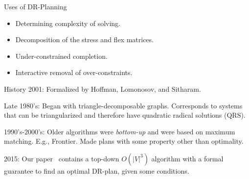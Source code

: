 \documentclass{mySlides}
\newcommand{\n}{\vspace{1em}}
\begin{document}
\begin{frame}{Uses of DR-Planning}
    \begin{itemize}
    \setlength\itemsep{1em}
        \item Determining complexity of solving.
        \item Decomposition of the stress and flex matrices.
        \item Under-constrained completion.
        \item Interactive removal of over-constraints.
    \end{itemize}









\end{frame}

\begin{frame}{History}
    2001: Formalized by Hoffman, Lomonosov, and Sitharam.~\cite{hoffman2001decompositionI}

    \n

    Late 1980's: Began with triangle-decomposable graphs. Corresponds to systems that can be triangularized and therefore have quadratic radical solutions (QRS).

    \n

    1990's-2000's: Older algorithms were \emph{bottom-up} and were based on maximum matching. E.g., Frontier. Made plans with some property other than optimality.

    \n

    2015: Our paper~\cite{baker2015optimal} contains a top-down $O(|V|^3)$ algorithm with a formal guarantee to find an optimal DR-plan, given some conditions.
\end{frame}
\end{document}
